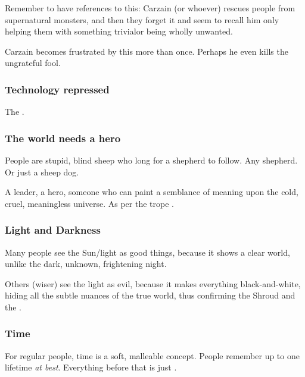 Remember to have references to this: Carzain (or whoever) rescues people from supernatural monsters, and then they forget it and seem to recall him only helping them with something trivial\dash or being wholly unwanted. 

Carzain becomes frustrated by this more than once. Perhaps he even kills the ungrateful fool.







\subsubsection{Technology repressed}
The . 







\subsubsection{The world needs a hero}
People are stupid, blind sheep who long for a shepherd to follow. Any shepherd. Or just a sheep dog. 

A leader, a hero, someone who can paint a semblance of meaning upon the cold, cruel, meaningless universe. As per the trope .







\subsubsection{Light and Darkness}
Many people see the Sun/light as good things, because it shows a clear world, unlike the dark, unknown, frightening night.

Others (wiser) see the light as evil, because it makes everything black-and-white, hiding all the subtle nuances of the true world, thus confirming the Shroud and the .







\subsubsection{Time}
For regular people, time is a soft, malleable concept. People remember up to one lifetime \emph{at best}. Everything before that is just . 

